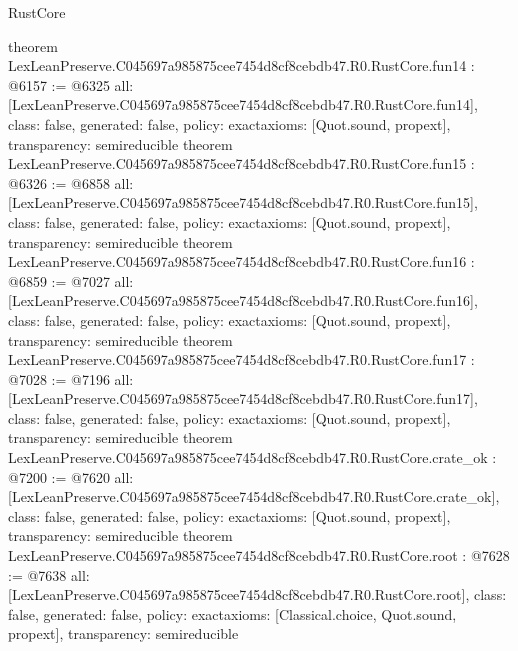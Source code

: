 \begin{lexlean}{RustCore}
\begin{coremodule}
{}
theorem LexLeanPreserve.C045697a985875cee7454d8cf8cebdb47.R0.RustCore.fun14 : @6157 := @6325 {
  all: [LexLeanPreserve.C045697a985875cee7454d8cf8cebdb47.R0.RustCore.fun14],
  class: false,
  generated: false,
  policy: exact{axioms: [Quot.sound, propext]},
  transparency: semireducible
}
theorem LexLeanPreserve.C045697a985875cee7454d8cf8cebdb47.R0.RustCore.fun15 : @6326 := @6858 {
  all: [LexLeanPreserve.C045697a985875cee7454d8cf8cebdb47.R0.RustCore.fun15],
  class: false,
  generated: false,
  policy: exact{axioms: [Quot.sound, propext]},
  transparency: semireducible
}
theorem LexLeanPreserve.C045697a985875cee7454d8cf8cebdb47.R0.RustCore.fun16 : @6859 := @7027 {
  all: [LexLeanPreserve.C045697a985875cee7454d8cf8cebdb47.R0.RustCore.fun16],
  class: false,
  generated: false,
  policy: exact{axioms: [Quot.sound, propext]},
  transparency: semireducible
}
theorem LexLeanPreserve.C045697a985875cee7454d8cf8cebdb47.R0.RustCore.fun17 : @7028 := @7196 {
  all: [LexLeanPreserve.C045697a985875cee7454d8cf8cebdb47.R0.RustCore.fun17],
  class: false,
  generated: false,
  policy: exact{axioms: [Quot.sound, propext]},
  transparency: semireducible
}
theorem LexLeanPreserve.C045697a985875cee7454d8cf8cebdb47.R0.RustCore.crate_ok : @7200 := @7620 {
  all: [LexLeanPreserve.C045697a985875cee7454d8cf8cebdb47.R0.RustCore.crate_ok],
  class: false,
  generated: false,
  policy: exact{axioms: [Quot.sound, propext]},
  transparency: semireducible
}
theorem LexLeanPreserve.C045697a985875cee7454d8cf8cebdb47.R0.RustCore.root : @7628 := @7638 {
  all: [LexLeanPreserve.C045697a985875cee7454d8cf8cebdb47.R0.RustCore.root],
  class: false,
  generated: false,
  policy: exact{axioms: [Classical.choice, Quot.sound, propext]},
  transparency: semireducible
}


\end{coremodule}
\end{lexlean}

